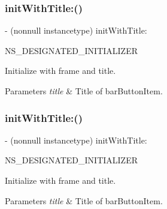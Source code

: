 \subsubsection{\texorpdfstring{init\+With\+Title\+:()}{initWithTitle:()}\hspace{0.1cm}{\footnotesize\ttfamily [2/3]}}
{\footnotesize\ttfamily -\/ (nonnull instancetype) init\+With\+Title\+: \begin{DoxyParamCaption}\item[{(nullable N\+S\+String $\ast$)}]{N\+S\+\_\+\+D\+E\+S\+I\+G\+N\+A\+T\+E\+D\+\_\+\+I\+N\+I\+T\+I\+A\+L\+I\+Z\+ER }\end{DoxyParamCaption}}

Initialize with frame and title.


\begin{DoxyParams}{Parameters}
{\em title} & Title of bar\+Button\+Item. \\
\hline
\end{DoxyParams}
\mbox{\label{interface_i_q_title_bar_button_item_a0797747aec7d0205a23e8126af7d3f53}} 
\subsubsection{\texorpdfstring{init\+With\+Title\+:()}{initWithTitle:()}\hspace{0.1cm}{\footnotesize\ttfamily [3/3]}}
{\footnotesize\ttfamily -\/ (nonnull instancetype) init\+With\+Title\+: \begin{DoxyParamCaption}\item[{(nullable N\+S\+String $\ast$)}]{N\+S\+\_\+\+D\+E\+S\+I\+G\+N\+A\+T\+E\+D\+\_\+\+I\+N\+I\+T\+I\+A\+L\+I\+Z\+ER }\end{DoxyParamCaption}}

Initialize with frame and title.


\begin{DoxyParams}{Parameters}
{\em title} & Title of bar\+Button\+Item. \\
\hline
\end{DoxyParams}
\mbox{\label{interface_i_q_title_bar_button_item_af033c2737f21ea89fe50f1753f4e8083}} 
